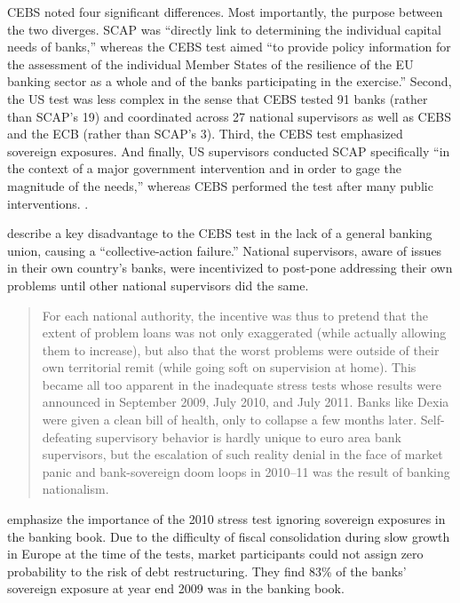\documentclass[12pt]{article}
\begin{document}
CEBS noted four significant differences. Most importantly, the purpose between the two diverges. SCAP was ``directly link to determining the individual capital needs of banks,'' whereas the CEBS test aimed ``to provide policy information for the assessment of the individual Member States of the resilience of the EU banking sector as a whole and of the banks participating in the exercise.'' Second, the US test was less complex in the sense that CEBS tested 91 banks (rather than SCAP's 19) and coordinated across 27  national supervisors as well as CEBS and the ECB (rather than SCAP's 3). Third, the CEBS test emphasized sovereign exposures. And finally, US supervisors conducted SCAP specifically ``in the context of a major government intervention and in order to gage the magnitude of the needs,'' whereas CEBS performed the test after many public interventions. \citep{QA}.

\citet{Posen} describe a key disadvantage to the CEBS test in the lack of a general banking union, causing a ``collective-action failure.'' National supervisors, aware of issues in their own country's banks, were incentivized to post-pone addressing their own problems until other national supervisors did the same.

\begin{quote}
For each national authority, the incentive was thus to pretend that the extent of problem loans was not only exaggerated (while actually allowing them to increase), but also that the worst problems were outside of their own territorial remit (while going soft on supervision at home). This became all too apparent in the inadequate stress tests whose results were announced in September 2009, July 2010, and July 2011. Banks like Dexia were given a clean bill of health, only to collapse a few months later. Self-defeating supervisory behavior is hardly unique to euro area bank supervisors, but the escalation of such reality denial in the face of market panic and bank-sovereign doom loops in 2010–11 was the result of banking nationalism.
\end{quote}

\citet{OECD} emphasize the importance of the 2010 stress test ignoring sovereign exposures in the banking book. Due to the difficulty of fiscal consolidation during slow growth in Europe at the time of the tests, market participants could not assign zero probability to the risk of debt restructuring. They find 83\% of the banks' sovereign exposure at year end 2009 was in the banking book.
\end{document}
